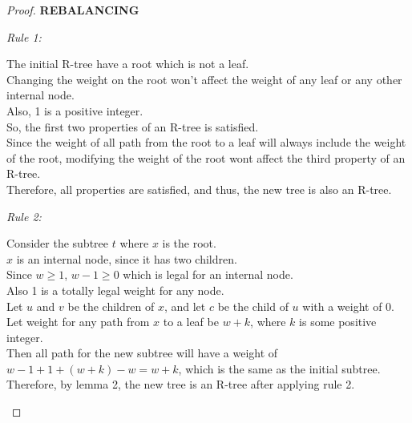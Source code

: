 \documentclass[10pt]{article}
\begin{document}
\begin{enumerate}
\begin{proof}
	\textbf{REBALANCING}
	\begin{addmargin}[1em]{0em}
		\textit{Rule 1:}
		\begin{addmargin}[1em]{0em}
			The initial R-tree have a root which is not a leaf. \\
			Changing the weight on the root won't affect the weight of any leaf
			or any other internal node. \\
			Also, 1 is a positive integer. \\
			So, the first two properties of an R-tree is satisfied. \\
			Since the weight of all path from the root to a leaf will always
			include the weight of the root, modifying the weight of the root
			wont affect the third property of an R-tree. \\
			Therefore, all properties are satisfied, and thus, the new tree is
			also an R-tree. \\
		\end{addmargin}
		\textit{Rule 2:}
		\begin{addmargin}[1em]{0em}
			Consider the subtree $t$ where $x$ is the root. \\
			$x$ is an internal node, since it has two children. \\
			Since $w \geq 1$, $w-1 \geq 0$ which is legal for an internal node.\\
			Also 1 is a totally legal weight for any node. \\
			Let $u$ and $v$ be the children of $x$, and let $c$ be the child of
			$u$ with a weight of 0. \\
			Let weight for any path from $x$ to a leaf be $w+k$, where $k$ is
			some positive integer. \\
			Then all path for the new subtree will have a weight of $w-1 + 1 +
			(w+k) - w = w+k$, which is the same as the initial subtree. \\
			Therefore, by lemma 2, the new tree is an R-tree after applying rule 2.
		\end{addmargin}


\end{addmargin}
\end{proof}
\end{enumerate}
\end{document}
